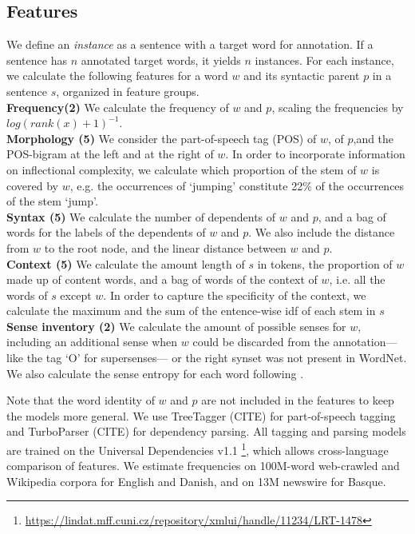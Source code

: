 \documentclass[11pt,a4paper]{article}
\begin{document}
\subsection{Features}
We define an \textit{instance} as a sentence with a target word for annotation. If a sentence has $n$ annotated target words, it yields $n$ instances. For each instance, we calculate the following features for a word $w$ and its syntactic parent $p$ in a sentence $s$, organized in feature groups.\\ 
\noindent\textbf{Frequency(2)} We calculate the frequency of $w$ and $p$, scaling the frequencies by $log(rank(x)+1)^{-1}$.\\
\textbf{ Morphology (5)} We consider the part-of-speech tag (POS) of $w$, of $p$,and the POS-bigram at the left and at the right of $w$. In order to incorporate information on inflectional complexity, we calculate which proportion of the stem of $w$ is covered by $w$, e.g. the occurrences of `jumping' constitute 22\% of the occurrences of the stem `jump'. \\
\textbf{Syntax (5)} We calculate the number of dependents of $w$ and $p$, and a bag of words for the labels of the dependents of $w$ and $p$. We also include the distance from $w$ to the root node, and the linear distance between $w$ and $p$.\\
\textbf{ Context  (5)} We calculate the amount length of $s$ in tokens, the proportion of $w$ made up of content words, and a bag of words of the context of $w$, i.e. all the words of $s$ except $w$. In order to capture the specificity of the context, we calculate the maximum and the sum of the entence-wise idf of each stem in $s$ \\
\textbf{Sense inventory (2)} We calculate the amount of possible senses for $w$, including an additional sense when $w$ could be discarded from the annotation---like the tag `O' for supersenses--- or the right synset was not present in WordNet. We also calculate the sense entropy for each word following . 

Note that the word identity of $w$ and $p$ are not included in the features to keep the models more general. We use TreeTagger (CITE) for part-of-speech tagging and TurboParser (CITE) for dependency parsing. All tagging and parsing models are trained on the Universal Dependencies v1.1 \footnote{\url{https://lindat.mff.cuni.cz/repository/xmlui/handle/11234/LRT-1478}}, which allows cross-language comparison of features. We estimate frequencies on 100M-word web-crawled and Wikipedia corpora for English and Danish, and on 13M newswire for Basque.
\end{document}
